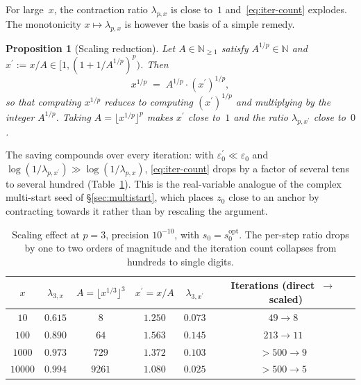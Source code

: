 \documentclass[11pt,a4paper]{article}
\newtheorem{proposition}[theorem]{Proposition}
\theoremstyle{definition}
\theoremstyle{remark}
\begin{document}
For large~$x$, the contraction ratio $\lambda_{p,x}$ is close to~$1$
and~\eqref{eq:iter-count} explodes. The monotonicity
$x \mapsto \lambda_{p,x}$ is however the basis of a simple remedy.

\begin{proposition}[Scaling reduction]\label{prop:scaling}
Let $A \in \mathbb{N}_{\geq 1}$ satisfy $A^{1/p} \in \mathbb{N}$ and
$x^\prime := x/A \in [1, (1 + 1/A^{1/p})^p)$. Then
\begin{equation}\label{eq:scaling-factorization}
  x^{1/p} \;=\; A^{1/p} \cdot (x^\prime)^{1/p},
\end{equation}
so that computing $x^{1/p}$ reduces to computing $(x^\prime)^{1/p}$ and
multiplying by the integer $A^{1/p}$. Taking $A = \lfloor x^{1/p} \rfloor^p$
makes $x^\prime$ close to~$1$ and the ratio $\lambda_{p,x^\prime}$ close
to~$0$.
\end{proposition}

The saving compounds over every iteration: with
$\varepsilon_0^\prime \ll \varepsilon_0$ and
$\log(1/\lambda_{p,x^\prime}) \gg \log(1/\lambda_{p,x})$,
\eqref{eq:iter-count} drops by a factor of several tens to several
hundred (Table~\ref{tab:scaling}). This is the real-variable analogue
of the complex multi-start seed of \S\ref{sec:multistart}, which
places $z_0$ close to an anchor by contracting towards it rather than
by rescaling the argument.

\begin{table}[H]
\centering
\small
\begin{tabular}{@{}cccccc@{}}
\toprule
$x$ & $\lambda_{3,x}$ & $A = \lfloor x^{1/3} \rfloor^3$
    & $x^\prime = x/A$ & $\lambda_{3,x^\prime}$
    & Iterations (direct~$\to$~scaled) \\
\midrule
$10$    & $0.615$ & $8$    & $1.250$ & $0.073$ & $49 \to 8$ \\
$100$   & $0.890$ & $64$   & $1.563$ & $0.145$ & $213 \to 11$ \\
$1000$  & $0.973$ & $729$  & $1.372$ & $0.103$ & $> 500 \to 9$ \\
$10000$ & $0.994$ & $9261$ & $1.080$ & $0.025$ & $> 500 \to 5$ \\
\bottomrule
\end{tabular}
\caption{Scaling effect at $p = 3$, precision $10^{-10}$, with
$s_0 = s_0^{\mathrm{opt}}$. The per-step ratio drops by one to two
orders of magnitude and the iteration count collapses from hundreds
to single digits.}
\label{tab:scaling}
\end{table}
\end{document}
